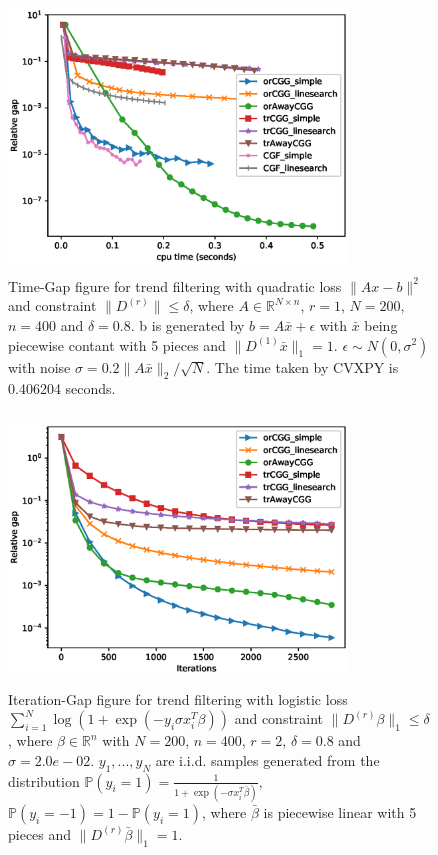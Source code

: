 \documentclass[english]{article}
\newcommand{\R}{\mathbb{R}}
\begin{document}
\begin{figure}[htbp]
	\centering
	\includegraphics[height=7.2cm,width=9cm]{Images/Leastsquare_Time_vs_RelativeGap_5.eps}
	\caption{Time-Gap figure for trend filtering with quadratic loss $\| Ax-b\|^2$ and constraint $\|D^{(r)}\| \le \delta$, where $A\in \R^{N\times n}$, $r=1$, $N=200$, $n=400$ and $\delta= 0.8$. b is generated by $b = A\bar x +\epsilon$ with $\bar x$ being piecewise contant with 5 pieces and $\|D^{(1)} \bar x\|_1 = 1$. $\epsilon \sim N(0, \sigma^2)$ with noise $\sigma= 0.2 \|A\bar x\|_2 / \sqrt{N}$. The time taken by CVXPY is 0.406204 seconds. }
	\label{Time-Gap5}
\end{figure}





\begin{figure}[htbp]
	\centering
	\includegraphics[height=7.2cm,width=9cm]{Images/Logistic_Iterations_vs_RelativeGap_99.eps}
	\caption{Iteration-Gap figure for trend filtering with logistic loss $\sum_{i=1}^N \log \left( 1+\exp(-y_i\sigma x_i^T \beta) \right)$ and constraint $\|D^{(r)} \beta\|_1 \le \delta$, where $\beta\in \R^n$ with $N= 200$, $n = 400$, $r = 2$, $\delta= 0.8$ and $\sigma= 2.0e-02$. $y_1,...,y_N$ are i.i.d. samples generated from the distribution $\mathbb{P}(y_i = 1) = \frac{1}{1+\exp(-\sigma x_i^T \bar \beta)}, $ $\mathbb{P}(y_i = -1) = 1- \mathbb{P}(y_i = 1)$, where $\bar \beta$ is piecewise linear with 5 pieces and $\|D^{(r)} \bar \beta\|_1 = 1$.}
	\label{Iteration-Gap99}
\end{figure}
\end{document}
